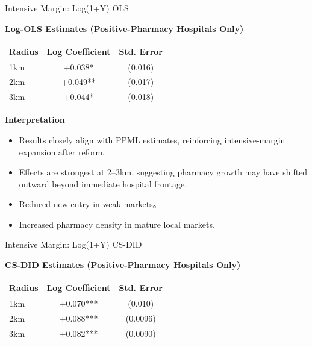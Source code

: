 \documentclass{beamer}
\begin{document}
\begin{frame}{Intensive Margin: Log(1+Y) OLS}

\textbf{Log-OLS Estimates (Positive-Pharmacy Hospitals Only)}

\begin{table}[htbp]
\centering
\small
\begin{tabular}{lccc}
\toprule
\textbf{Radius} & \textbf{Log Coefficient} & \textbf{Std. Error} \\
\midrule
1km & +0.038* & (0.016) \\
2km & +0.049** & (0.017) \\
3km & +0.044* & (0.018) \\
\bottomrule
\end{tabular}
\end{table}

\vspace{0.3cm}

\textbf{Interpretation}

\begin{itemize}

    \item Results closely align with PPML estimates, reinforcing intensive-margin expansion after reform.
    \item Effects are strongest at 2–3km, suggesting pharmacy growth may have shifted outward beyond immediate hospital frontage.

    \item Reduced new entry in weak markets。
    \item Increased pharmacy density in mature local markets.
   
\end{itemize}

\end{frame}


\begin{frame}{Intensive Margin: Log(1+Y) CS-DID}

\textbf{CS-DID Estimates (Positive-Pharmacy Hospitals Only)}

\begin{table}[htbp]
\centering
\small
\begin{tabular}{lcc}
\toprule
\textbf{Radius} & \textbf{Log Coefficient} & \textbf{Std. Error} \\
\midrule
1km & +0.070*** & (0.010) \\
2km & +0.088*** & (0.0096) \\
3km & +0.082*** & (0.0090) \\
\bottomrule
\end{tabular}
\end{table}

\end{frame}
\end{document}
